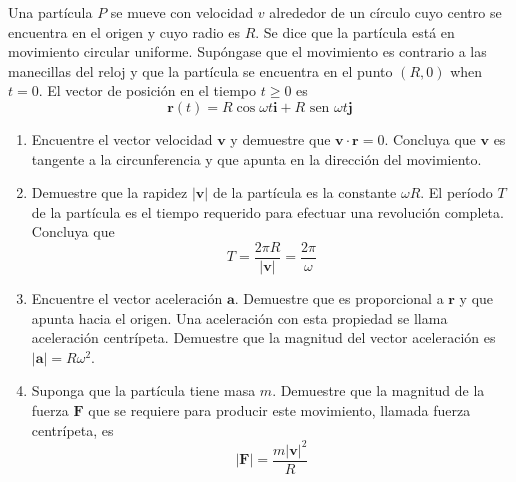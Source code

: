 \item Una partícula $P$ se mueve con velocidad $v$ alrededor de un círculo cuyo centro se encuentra en el origen y cuyo radio es $R$. Se dice que la partícula está en movimiento circular uniforme. Supóngase que el movimiento es contrario a las manecillas del reloj y que la partícula se encuentra en el punto $(R, 0)$ when $t = 0$. El vector de posición en el tiempo $t \ge 0$ es
    \[
    \mathbf{r}(t) = R \cos \omega t \mathbf{i} + R \text{ sen } \omega t \mathbf{j}
    \]
    \begin{enumerate}
        \item Encuentre el vector velocidad $\mathbf{v}$ y demuestre que $\mathbf{v} \cdot \mathbf{r} = 0$. Concluya que $\mathbf{v}$ es tangente a la circunferencia y que apunta en la dirección del movimiento.
        \item Demuestre que la rapidez $|\mathbf{v}|$ de la partícula es la constante $\omega R$. El período $T$ de la partícula es el tiempo requerido para efectuar una revolución completa. Concluya que
        \[
        T = \frac{2\pi R}{|\mathbf{v}|} = \frac{2\pi}{\omega}
        \]
        \item Encuentre el vector aceleración $\mathbf{a}$. Demuestre que es proporcional a $\mathbf{r}$ y que apunta hacia el origen. Una aceleración con esta propiedad se llama aceleración centrípeta. Demuestre que la magnitud del vector aceleración es $|\mathbf{a}| = R\omega^2$.
        \item Suponga que la partícula tiene masa $m$. Demuestre que la magnitud de la fuerza $\mathbf{F}$ que se requiere para producir este movimiento, llamada fuerza centrípeta, es
        \[
        |\mathbf{F}| = \frac{m|\mathbf{v}|^2}{R}
        \]
    \end{enumerate}

